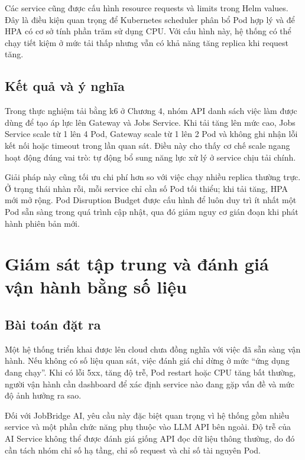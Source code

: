 \documentclass[../DoAn.tex]{subfiles}
\begin{document}
Các service cũng được cấu hình resource requests và limits trong Helm values. Đây là điều kiện quan trọng để Kubernetes scheduler phân bổ Pod hợp lý và để HPA có cơ sở tính phần trăm sử dụng CPU. Với cấu hình này, hệ thống có thể chạy tiết kiệm ở mức tải thấp nhưng vẫn có khả năng tăng replica khi request tăng.

\subsection{Kết quả và ý nghĩa}

Trong thực nghiệm tải bằng k6 ở Chương 4, nhóm API danh sách việc làm được dùng để tạo áp lực lên Gateway và Jobs Service. Khi tải tăng lên mức cao, Jobs Service scale từ 1 lên 4 Pod, Gateway scale từ 1 lên 2 Pod và không ghi nhận lỗi kết nối hoặc timeout trong lần quan sát. Điều này cho thấy cơ chế scale ngang hoạt động đúng vai trò: tự động bổ sung năng lực xử lý ở service chịu tải chính.

Giải pháp này cũng tối ưu chi phí hơn so với việc chạy nhiều replica thường trực. Ở trạng thái nhàn rỗi, mỗi service chỉ cần số Pod tối thiểu; khi tải tăng, HPA mới mở rộng. Pod Disruption Budget được cấu hình để luôn duy trì ít nhất một Pod sẵn sàng trong quá trình cập nhật, qua đó giảm nguy cơ gián đoạn khi phát hành phiên bản mới.

\section{Giám sát tập trung và đánh giá vận hành bằng số liệu}
\label{sec:solution-observability}

\subsection{Bài toán đặt ra}

Một hệ thống triển khai được lên cloud chưa đồng nghĩa với việc đã sẵn sàng vận hành. Nếu không có số liệu quan sát, việc đánh giá chỉ dừng ở mức ``ứng dụng đang chạy''. Khi có lỗi 5xx, tăng độ trễ, Pod restart hoặc CPU tăng bất thường, người vận hành cần dashboard để xác định service nào đang gặp vấn đề và mức độ ảnh hưởng ra sao.

Đối với JobBridge AI, yêu cầu này đặc biệt quan trọng vì hệ thống gồm nhiều service và một phần chức năng phụ thuộc vào LLM API bên ngoài. Độ trễ của AI Service không thể được đánh giá giống API đọc dữ liệu thông thường, do đó cần tách nhóm chỉ số hạ tầng, chỉ số request và chỉ số tài nguyên Pod.
\end{document}
